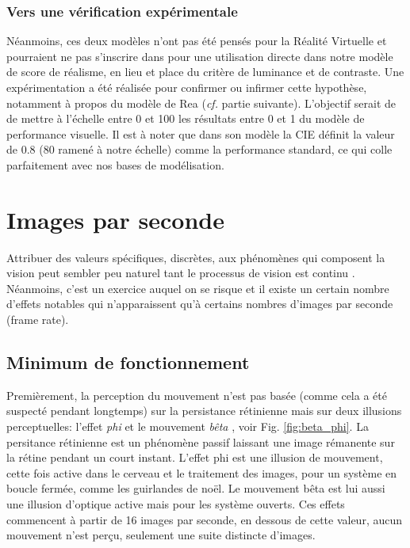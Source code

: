 	\subsubsection{Vers une vérification expérimentale}
	\par Néanmoins, ces deux modèles n'ont pas été pensés pour la Réalité Virtuelle et pourraient ne pas s'inscrire dans pour une utilisation directe dans notre modèle de score de réalisme, en lieu et place du critère de luminance et de contraste. Une expérimentation a été réalisée pour confirmer ou infirmer cette hypothèse, notamment à propos du modèle de Rea (\textit{cf.} partie suivante). L'objectif serait de de mettre à l'échelle entre 0 et 100 les résultats entre 0 et 1 du modèle de performance visuelle. Il est à noter que dans son modèle la CIE définit la valeur de 0.8 (80 ramené à notre échelle) comme la performance standard, ce qui colle parfaitement avec nos bases de modélisation.
	
	\section{Images par seconde}	
	\par Attribuer des valeurs spécifiques, discrètes, aux phénomènes qui composent la vision peut sembler peu naturel tant le processus de vision est continu \citep{bear_neurosciences:_2007}. Néanmoins, c'est un exercice auquel on se risque et il existe un certain nombre d'effets notables qui n'apparaissent qu'à certains nombres d'images par seconde (frame rate).
	
	\subsection{Minimum de fonctionnement}
	\par Premièrement, la perception du mouvement n'est pas basée (comme cela a été suspecté pendant longtemps) sur la persistance rétinienne mais sur deux illusions perceptuelles: l'effet \textit{phi} et le mouvement \textit{bêta} \citep{de_lauretis_flicker_1980}, voir Fig. \ref{fig:beta_phi}. La persitance rétinienne est un phénomène passif laissant une image rémanente sur la rétine pendant un court instant. L'effet phi est une illusion de mouvement, cette fois active dans le cerveau et le traitement des images, pour un système en boucle fermée, comme les guirlandes de noël. Le mouvement bêta est lui aussi une illusion d'optique active mais pour les système ouverts. Ces effets commencent à partir de 16 images par seconde, en dessous de cette valeur, aucun mouvement n'est perçu, seulement une suite distincte d'images.
	

